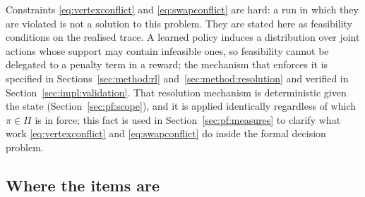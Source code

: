 \documentclass[../main.tex]{subfiles}
\begin{document}
Constraints \eqref{eq:vertexconflict} and \eqref{eq:swapconflict} are hard: a run in
which they are violated is not a solution to this problem. They are stated here
as feasibility conditions on the realised trace. A learned policy induces a
distribution over joint actions whose support may contain infeasible ones, so
feasibility cannot be delegated to a penalty term in a reward; the mechanism that
enforces it is specified in Sections~\ref{sec:method:rl}
and~\ref{sec:method:resolution} and verified in Section~\ref{sec:impl:validation}.
That resolution mechanism is deterministic given the state (Section~\ref{sec:pf:scope}), and it is applied identically regardless of which $\pi \in \Pi$
is in force; this fact is used in Section~\ref{sec:pf:measures} to clarify what
work \eqref{eq:vertexconflict} and \eqref{eq:swapconflict} do inside the formal
decision problem.

\subsection{Where the items are}
\label{sec:pf:storage}
\end{document}
